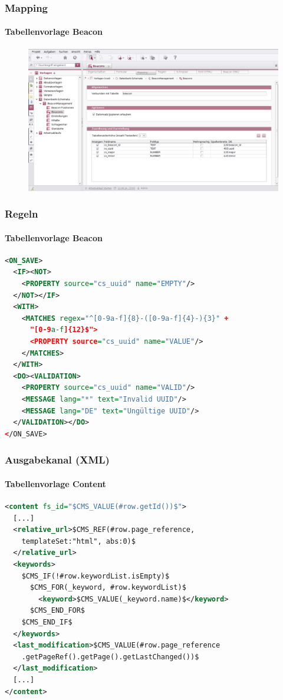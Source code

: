 \documentclass{beamer}
\begin{document}
\begin{frame}
\frametitle{Mapping}
\framesubtitle{Tabellenvorlage Beacon}

\begin{figure}[!h]
\centering
\includegraphics[scale=0.24]{./Abbildungen/mapping-table-beacon.png}
\end{figure}

\end{frame}

\begin{frame}[fragile]
\frametitle{Regeln}
\framesubtitle{Tabellenvorlage Beacon}

\begin{lstlisting}[language=XML, basicstyle=\ttfamily\scriptsize]
<ON_SAVE>
  <IF><NOT>
    <PROPERTY source="cs_uuid" name="EMPTY"/>
  </NOT></IF>
  <WITH>
    <MATCHES regex="^[0-9a-f]{8}-([0-9a-f]{4}-){3}" + 
      "[0-9a-f]{12}$">
      <PROPERTY source="cs_uuid" name="VALUE"/>
    </MATCHES>
  </WITH>
  <DO><VALIDATION>
    <PROPERTY source="cs_uuid" name="VALID"/>
    <MESSAGE lang="*" text="Invalid UUID"/>
    <MESSAGE lang="DE" text="Ungültige UUID"/>
  </VALIDATION></DO>
</ON_SAVE>
\end{lstlisting}

\end{frame}

\begin{frame}[fragile]
\frametitle{Ausgabekanal (XML)}
\framesubtitle{Tabellenvorlage Content}

\begin{lstlisting}[language=xml, basicstyle=\ttfamily\scriptsize] 
<content fs_id="$CMS_VALUE(#row.getId())$"> 
  [...]
  <relative_url>$CMS_REF(#row.page_reference, 
    templateSet:"html", abs:0)$
  </relative_url>
  <keywords>
    $CMS_IF(!#row.keywordList.isEmpty)$
      $CMS_FOR(_keyword, #row.keywordList)$
        <keyword>$CMS_VALUE(_keyword.name)$</keyword>
      $CMS_END_FOR$
    $CMS_END_IF$
  </keywords>
  <last_modification>$CMS_VALUE(#row.page_reference
    .getPageRef().getPage().getLastChanged())$
  </last_modification>
  [...]
</content>
\end{lstlisting}

\end{frame}
\end{document}
